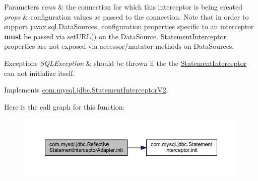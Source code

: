 \begin{DoxyParams}{Parameters}
{\em conn} & the connection for which this interceptor is being created \\
\hline
{\em props} & configuration values as passed to the connection. Note that in order to support javax.\+sql.\+Data\+Sources, configuration properties specific to an interceptor {\bfseries must} be passed via set\+U\+R\+L() on the Data\+Source. \mbox{\hyperlink{interfacecom_1_1mysql_1_1jdbc_1_1_statement_interceptor}{Statement\+Interceptor}} properties are not exposed via accessor/mutator methods on Data\+Sources.\\
\hline
\end{DoxyParams}

\begin{DoxyExceptions}{Exceptions}
{\em S\+Q\+L\+Exception} & should be thrown if the the \mbox{\hyperlink{interfacecom_1_1mysql_1_1jdbc_1_1_statement_interceptor}{Statement\+Interceptor}} can not initialize itself. \\
\hline
\end{DoxyExceptions}


Implements \mbox{\hyperlink{interfacecom_1_1mysql_1_1jdbc_1_1_statement_interceptor_v2_ae2d3d924826dcf4a4e025433af0b4d8f}{com.\+mysql.\+jdbc.\+Statement\+Interceptor\+V2}}.

Here is the call graph for this function\+:
\nopagebreak
\begin{figure}[H]
\begin{center}
\leavevmode
\includegraphics[width=350pt]{classcom_1_1mysql_1_1jdbc_1_1_reflective_statement_interceptor_adapter_ae2a1db7cc624f326d2a0bf7d1b5b6e3d_cgraph}
\end{center}
\end{figure}
\mbox{\label{classcom_1_1mysql_1_1jdbc_1_1_reflective_statement_interceptor_adapter_a2b91745fad9110e1f8f33fc4ce4b6be1}} 
